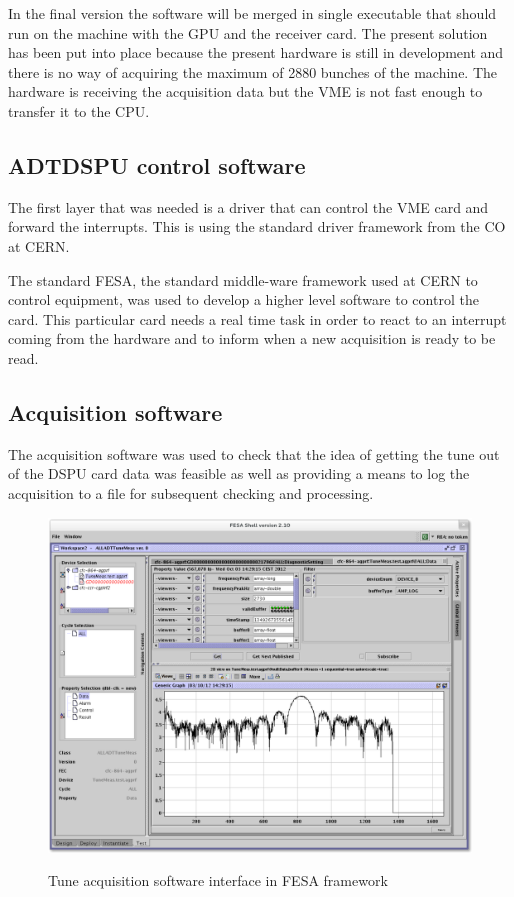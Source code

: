 In the final version the software will be merged in single executable that should run on the machine with the \gls{GPU} and the receiver card. The present solution has been put into place because the present hardware is still in development and there is no way of acquiring the maximum of 2880 bunches of the machine. The hardware is receiving the acquisition data but the \gls{VME} is not fast enough to transfer it to the \gls{CPU}.

	\subsection{ADTDSPU control software}

	The first layer that was needed is a driver that can control the \gls{VME} card and forward the interrupts. This is using the standard driver framework from the \gls{CO} at \gls{CERN}.

	The standard \gls{FESA}, the standard middle-ware framework used at \gls{CERN} to control equipment, was used to develop a higher level software to control the card. This particular card needs a real time task in order to react to an interrupt coming from the hardware and to inform when a new acquisition is ready to be read.

	\subsection{Acquisition software}

	The acquisition software was used to check that the idea of getting the tune out of the DSPU card data was feasible as well as providing a means to log the acquisition to a file for subsequent checking and processing.

	\begin{figure}[H]
	\caption{Tune acquisition software interface in FESA framework}
	\centering
	\includegraphics[scale=0.25]{amplitude_log.pdf}
	\label{fig:tuneacq}
	\end{figure}


